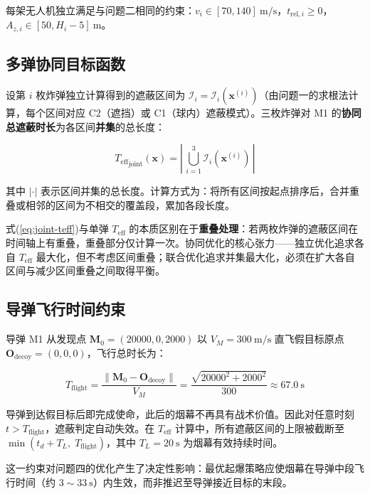 \documentclass[12pt,a4paper]{ctexart}
\newcommand{\Teff}{T_{\text{eff}}}
\begin{document}
每架无人机独立满足与问题二相同的约束：$v_i \in [70, 140]\ \mathrm{m/s}$，$t_{\text{rel},i} \geq 0$，$A_{z,i} \in [50, H_i - 5]\ \mathrm{m}$。

\subsection{多弹协同目标函数}

设第 $i$ 枚炸弹独立计算得到的遮蔽区间为 $\mathcal{I}_i = \mathcal{I}_i(\mathbf{x}^{(i)})$（由问题一的求根法计算，每个区间对应 C2（遮挡）或 C1（球内）遮蔽模式）。三枚炸弹对 M1 的\textbf{协同总遮蔽时长}为各区间\textbf{并集}的总长度：

\begin{equation}
\boxed{{\Teff}_{\text{joint}}(\mathbf{x}) = \left|\,\bigcup_{i=1}^{3} \mathcal{I}_i(\mathbf{x}^{(i)})\,\right|}
\label{eq:joint-teff}
\end{equation}

其中 $|\cdot|$ 表示区间并集的总长度。计算方式为：将所有区间按起点排序后，合并重叠或相邻的区间为不相交的覆盖段，累加各段长度。

式(\ref{eq:joint-teff})与单弹 $\Teff$ 的本质区别在于\textbf{重叠处理}：若两枚炸弹的遮蔽区间在时间轴上有重叠，重叠部分仅计算一次。协同优化的核心张力——独立优化追求各自 $\Teff$ 最大化，但不考虑区间重叠；联合优化追求并集最大化，必须在扩大各自区间与减少区间重叠之间取得平衡。

\subsection{导弹飞行时间约束}

导弹 M1 从发现点 $\mathbf{M}_0 = (20000, 0, 2000)$ 以 $V_M = 300\ \mathrm{m/s}$ 直飞假目标原点 $\mathbf{O}_{\text{decoy}} = (0, 0, 0)$，飞行总时长为：

\begin{equation}
T_{\text{flight}} = \frac{\|\mathbf{M}_0 - \mathbf{O}_{\text{decoy}}\|}{V_M}
= \frac{\sqrt{20000^2 + 2000^2}}{300} \approx 67.0\ \mathrm{s}
\label{eq:t-flight}
\end{equation}

导弹到达假目标后即完成使命，此后的烟幕不再具有战术价值。因此对任意时刻 $t > T_{\text{flight}}$，遮蔽判定自动失效。在 $\Teff$ 计算中，所有遮蔽区间的上限被截断至 $\min(t_d + T_L,\; T_{\text{flight}})$，其中 $T_L = 20\ \mathrm{s}$ 为烟幕有效持续时间。

这一约束对问题四的优化产生了决定性影响：最优起爆策略应使烟幕在导弹中段飞行时间（约 $3 \sim 33\ \mathrm{s}$）内生效，而非推迟至导弹接近目标的末段。
\end{document}
